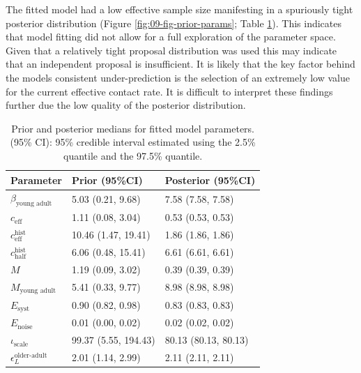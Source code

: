 \documentclass[11pt,twoside]{bristolthesis}
\begin{document}
  The fitted model had a low effective sample size manifesting in a spuriously tight posterior distribution (Figure \ref{fig:09-fig-prior-params}; Table \ref{tab:09-prior-posterior}). This indicates that model fitting did not allow for a full exploration of the parameter space. Given that a relatively tight proposal distribution was used this may indicate that an independent proposal is insufficient. It is likely that the key factor behind the models consistent under-prediction is the selection of an extremely low value for the current effective contact rate. It is difficult to interpret these findings further due the low quality of the posterior distribution.
  \begin{longtable}{lll}
  \caption[Prior and posterior medians for fitted model parameters]{\label{tab:09-prior-posterior}Prior and posterior medians for fitted model parameters. (95\% CI): 95\% credible interval estimated using the 2.5\% quantile and the 97.5\% quantile.}\\
  \toprule
  Parameter & Prior (95\%CI) & Posterior (95\%CI)\\
  \midrule
  $\beta_{\text{young adult}}$ & 5.03 (0.21, 9.68) & 7.58 (7.58, 7.58)\\
  $c_{\text{eff}}$ & 1.11 (0.08, 3.04) & 0.53 (0.53, 0.53)\\
  $c^{\text{hist}}_{\text{eff}}$ & 10.46 (1.47, 19.41) & 1.86 (1.86, 1.86)\\
  $c^{\text{hist}}_{\text{half}}$ & 6.06 (0.48, 15.41) & 6.61 (6.61, 6.61)\\
  $M$ & 1.19 (0.09, 3.02) & 0.39 (0.39, 0.39)\\
  \addlinespace
  $M_{\text{young adult}}$ & 5.41 (0.33, 9.77) & 8.98 (8.98, 8.98)\\
  $E_{\text{syst}}$ & 0.90 (0.82, 0.98) & 0.83 (0.83, 0.83)\\
  $E_{\text{noise}}$ & 0.01 (0.00, 0.02) & 0.02 (0.02, 0.02)\\
  $\iota_{\text{scale}}$ & 99.37 (5.55, 194.43) & 80.13 (80.13, 80.13)\\
  $\epsilon^{\text{older-adult}}_L$ & 2.01 (1.14, 2.99) & 2.11 (2.11, 2.11)\\
  \bottomrule
  \end{longtable}
\end{document}
